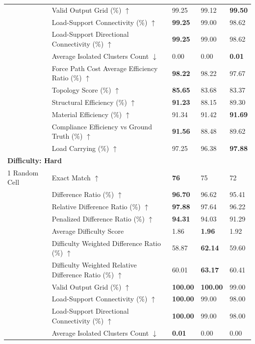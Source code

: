 \begin{table}[!h]
{\begin{tabular}{lllll}
 & Valid Output Grid (\%) $\uparrow$ & 99.25 & 99.12 & \textbf{99.50} \\
 & Load-Support Connectivity (\%) $\uparrow$ & \textbf{99.25} & 99.00 & 98.62 \\
 & Load-Support Directional Connectivity (\%) $\uparrow$ & \textbf{99.25} & 99.00 & 98.62 \\
 & Average Isolated Clusters Count $\downarrow$ & 0.00 & 0.00 & \textbf{0.01} \\
 & Force Path Cost Average Efficiency Ratio (\%) $\uparrow$ & \textbf{98.22} & 98.22 & 97.67 \\
 & Topology Score (\%) $\uparrow$ & \textbf{85.65} & 83.68 & 83.37 \\
 & Structural Efficiency (\%) $\uparrow$ & \textbf{91.23} & 88.15 & 89.30 \\
 & Material Efficiency (\%) $\uparrow$ & 91.34 & 91.42 & \textbf{91.69} \\
 & Compliance Efficiency vs Ground Truth (\%) $\uparrow$ & \textbf{91.56} & 88.48 & 89.62 \\
 & Load Carrying (\%) $\uparrow$ & 97.25 & 96.38 & \textbf{97.88} \\
\midrule
\multicolumn{5}{l}{\textbf{Difficulty: Hard}}\\
\midrule
1 Random Cell & Exact Match $\uparrow$ & \textbf{76} & 75 & 72 \\
 & Difference Ratio (\%) $\uparrow$ & \textbf{96.70} & 96.62 & 95.41 \\
 & Relative Difference Ratio (\%) $\uparrow$ & \textbf{97.88} & 97.64 & 96.22 \\
 & Penalized Difference Ratio (\%) $\uparrow$ & \textbf{94.31} & 94.03 & 91.29 \\
 & Average Difficulty Score & 1.86 & \textbf{1.96} & 1.92 \\
 & Difficulty Weighted Difference Ratio (\%) $\uparrow$ & 58.87 & \textbf{62.14} & 59.60 \\
 & Difficulty Weighted Relative Difference Ratio (\%) $\uparrow$ & 60.01 & \textbf{63.17} & 60.41 \\
 & Valid Output Grid (\%) $\uparrow$ & \textbf{100.00} & \textbf{100.00} & 99.00 \\
 & Load-Support Connectivity (\%) $\uparrow$ & \textbf{100.00} & 99.00 & 98.00 \\
 & Load-Support Directional Connectivity (\%) $\uparrow$ & \textbf{100.00} & 99.00 & 98.00 \\
 & Average Isolated Clusters Count $\downarrow$ & \textbf{0.01} & 0.00 & 0.00 \\

\end{tabular}}
\end{table}
